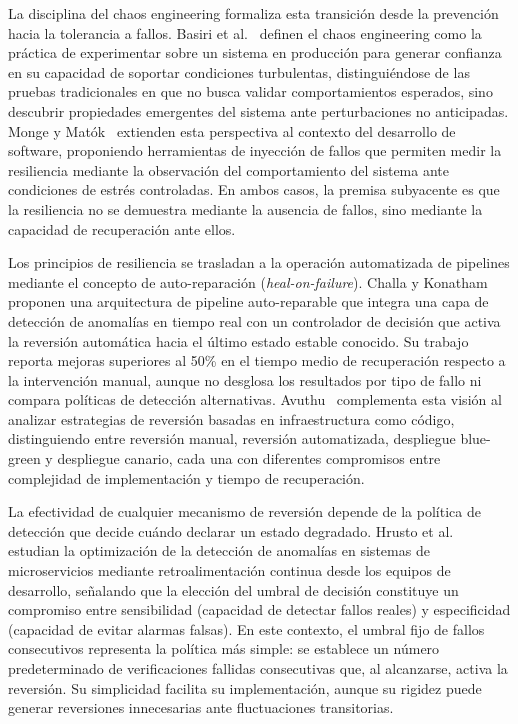 \documentclass[conference]{IEEEtran}
\begin{document}
La disciplina del chaos engineering formaliza esta transici\'on desde la prevenci\'on hacia la tolerancia a fallos. Basiri et al.~\cite{basiri2016chaos} definen el chaos engineering como la pr\'actica de experimentar sobre un sistema en producci\'on para generar confianza en su capacidad de soportar condiciones turbulentas, distingui\'endose de las pruebas tradicionales en que no busca validar comportamientos esperados, sino descubrir propiedades emergentes del sistema ante perturbaciones no anticipadas. Monge y Mat\'ok~\cite{monge2020developing} extienden esta perspectiva al contexto del desarrollo de software, proponiendo herramientas de inyecci\'on de fallos que permiten medir la resiliencia mediante la observaci\'on del comportamiento del sistema ante condiciones de estr\'es controladas. En ambos casos, la premisa subyacente es que la resiliencia no se demuestra mediante la ausencia de fallos, sino mediante la capacidad de recuperaci\'on ante ellos.

Los principios de resiliencia se trasladan a la operaci\'on automatizada de pipelines mediante el concepto de auto-reparaci\'on (\textit{heal-on-failure}). Challa y Konatham~\cite{challa2024selfhealing} proponen una arquitectura de pipeline auto-reparable que integra una capa de detecci\'on de anomal\'ias en tiempo real con un controlador de decisi\'on que activa la reversi\'on autom\'atica hacia el \'ultimo estado estable conocido. Su trabajo reporta mejoras superiores al 50\% en el tiempo medio de recuperaci\'on respecto a la intervenci\'on manual, aunque no desglosa los resultados por tipo de fallo ni compara pol\'iticas de detecci\'on alternativas. Avuthu~\cite{avuthu2021change} complementa esta visi\'on al analizar estrategias de reversi\'on basadas en infraestructura como c\'odigo, distinguiendo entre reversi\'on manual, reversi\'on automatizada, despliegue blue-green y despliegue canario, cada una con diferentes compromisos entre complejidad de implementaci\'on y tiempo de recuperaci\'on.

La efectividad de cualquier mecanismo de reversi\'on depende de la pol\'itica de detecci\'on que decide cu\'ando declarar un estado degradado. Hrusto et al.~\cite{hrusto2022optimization} estudian la optimizaci\'on de la detecci\'on de anomal\'ias en sistemas de microservicios mediante retroalimentaci\'on continua desde los equipos de desarrollo, se\~nalando que la elecci\'on del umbral de decisi\'on constituye un compromiso entre sensibilidad (capacidad de detectar fallos reales) y especificidad (capacidad de evitar alarmas falsas). En este contexto, el umbral fijo de fallos consecutivos representa la pol\'itica m\'as simple: se establece un n\'umero predeterminado de verificaciones fallidas consecutivas que, al alcanzarse, activa la reversi\'on. Su simplicidad facilita su implementaci\'on, aunque su rigidez puede generar reversiones innecesarias ante fluctuaciones transitorias.
\end{document}

